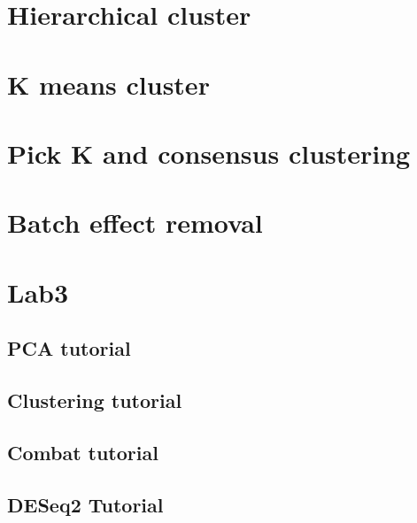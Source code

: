 \documentclass[
]{book}
\begin{document}
\hypertarget{hierarchical-cluster}{%
\section{Hierarchical cluster}\label{hierarchical-cluster}}

\hypertarget{k-means-cluster}{%
\section{K means cluster}\label{k-means-cluster}}

\hypertarget{pick-k-and-consensus-clustering}{%
\section{Pick K and consensus clustering}\label{pick-k-and-consensus-clustering}}

\hypertarget{batch-effect-removal}{%
\section{Batch effect removal}\label{batch-effect-removal}}

\hypertarget{lab3}{%
\section{Lab3}\label{lab3}}

\hypertarget{pca-tutorial}{%
\subsection{PCA tutorial}\label{pca-tutorial}}

\hypertarget{clustering-tutorial}{%
\subsection{Clustering tutorial}\label{clustering-tutorial}}

\hypertarget{combat-tutorial}{%
\subsection{Combat tutorial}\label{combat-tutorial}}

\hypertarget{deseq2-tutorial-1}{%
\subsection{DESeq2 Tutorial}\label{deseq2-tutorial-1}}
\end{document}
